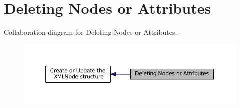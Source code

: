 \hypertarget{group__xmlDelete}{\section{Deleting Nodes or Attributes}
\label{group__xmlDelete}
}
Collaboration diagram for Deleting Nodes or Attributes\-:
\nopagebreak
\begin{figure}[H]
\begin{center}
\leavevmode
\includegraphics[width=350pt]{group__xmlDelete}
\end{center}
\end{figure}
